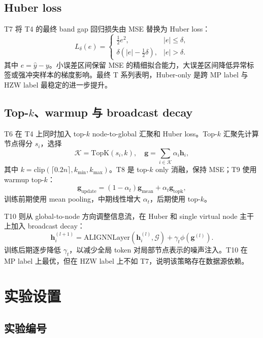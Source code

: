 \documentclass[UTF8,a4paper,11pt]{ctexart}
\begin{document}
\subsection{Huber loss}

T7 将 T4 的最终 band gap 回归损失由 MSE 替换为 Huber loss：
\begin{equation}
L_{\delta}(e)=
\begin{cases}
\frac{1}{2}e^2, & |e|\le \delta,\\
\delta(|e|-\frac{1}{2}\delta), & |e|>\delta.
\end{cases}
\end{equation}
其中 $e=\hat{y}-y$。小误差区间保留 MSE 的精细拟合能力，大误差区间降低异常标签或强冲突样本的梯度影响。最终 T 系列表明，Huber-only 是跨 MP label 与 HZW label 最稳定的进一步提升。

\subsection{Top-$k$、warmup 与 broadcast decay}

T6 在 T4 上同时加入 top-$k$ node-to-global 汇聚和 Huber loss。Top-$k$ 汇聚先计算节点得分 $s_i$，选择
\begin{equation}
\mathcal{K}=\mathrm{TopK}(s_i,k),\quad
\mathbf{g}=\sum_{i\in\mathcal{K}}\alpha_i\mathbf{h}_i,
\end{equation}
其中 $k=\mathrm{clip}(\lceil0.2n\rceil,k_{\min},k_{\max})$。T8 是 top-$k$ only 消融，保持 MSE；T9 使用 warmup top-$k$：
\begin{equation}
\mathbf{g}_{\mathrm{update}}=
(1-\alpha_t)\mathbf{g}_{\mathrm{mean}}+\alpha_t\mathbf{g}_{\mathrm{topk}},
\end{equation}
训练前期使用 mean pooling，中期线性增大 $\alpha_t$，后期使用 top-$k$。

T10 则从 global-to-node 方向调整信息流，在 Huber 和 single virtual node 主干上加入 broadcast decay：
\begin{equation}
\mathbf{h}_i^{(l+1)}
= \mathrm{ALIGNNLayer}(\mathbf{h}_i^{(l)},\mathcal{G})
+ \gamma_t\phi(\mathbf{g}^{(l)}).
\end{equation}
训练后期逐步降低 $\gamma_t$，以减少全局 token 对局部节点表示的噪声注入。T10 在 MP label 上最优，但在 HZW label 上不如 T7，说明该策略存在数据源依赖。

\section{实验设置}

\subsection{实验编号}
\end{document}
